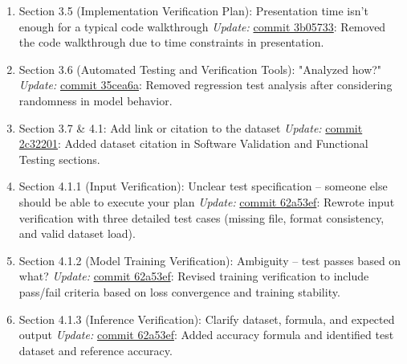 \documentclass{article}
\begin{document}
\begin{enumerate}
    \item Section 3.5 (Implementation Verification Plan): Presentation time isn’t enough for a typical code walkthrough  
    \newline \textit{Update:} \href{https://github.com/Yuanqi-X/Re-ProtGNN/commit/3b05733b10487030f556c6c1e09b1e0b9a60fd9b}{commit 3b05733}: Removed the code walkthrough due to time constraints in presentation.

    \item Section 3.6 (Automated Testing and Verification Tools): "Analyzed how?"  
    \newline \textit{Update:} \href{https://github.com/Yuanqi-X/Re-ProtGNN/commit/35cea6a25da0cb5d2aaed04dcd19579cb0354402}{commit 35cea6a}: Removed regression test analysis after considering randomness in model behavior.

    \item Section 3.7 \& 4.1: Add link or citation to the dataset  
    \newline \textit{Update:} \href{https://github.com/Yuanqi-X/Re-ProtGNN/commit/2c32201bed39d4a71140e5821c3c7bc47cd089b6}{commit 2c32201}: Added dataset citation in Software Validation and Functional Testing sections.

    \item Section 4.1.1 (Input Verification): Unclear test specification – someone else should be able to execute your plan  
    \newline \textit{Update:} \href{https://github.com/Yuanqi-X/Re-ProtGNN/commit/62a53ef0b6e3976fa655f35fff21a876cd84d82a}{commit 62a53ef}: Rewrote input verification with three detailed test cases (missing file, format consistency, and valid dataset load).

    \item Section 4.1.2 (Model Training Verification): Ambiguity – test passes based on what?  
    \newline \textit{Update:} \href{https://github.com/Yuanqi-X/Re-ProtGNN/commit/62a53ef0b6e3976fa655f35fff21a876cd84d82a}{commit 62a53ef}: Revised training verification to include pass/fail criteria based on loss convergence and training stability.

    \item Section 4.1.3 (Inference Verification): Clarify dataset, formula, and expected output  
    \newline \textit{Update:} \href{https://github.com/Yuanqi-X/Re-ProtGNN/commit/62a53ef0b6e3976fa655f35fff21a876cd84d82a}{commit 62a53ef}: Added accuracy formula and identified test dataset and reference accuracy.


\end{enumerate}
\end{document}
